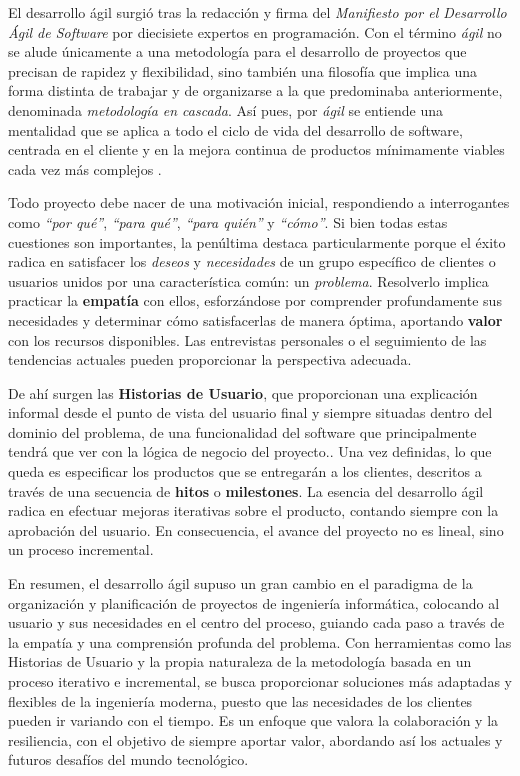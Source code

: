 \vspace{0.5cm}
El desarrollo ágil surgió tras la redacción y firma del \textit{Manifiesto por el Desarrollo Ágil de Software} \cite{agile-manifest} por diecisiete expertos en programación. Con el término \textit{ágil} no se alude únicamente a una metodología para el desarrollo de proyectos que precisan de rapidez y flexibilidad, sino también una filosofía que implica una forma distinta de trabajar y de organizarse a la que predominaba anteriormente, denominada \textit{metodología en cascada}. Así pues, por \textit{ágil} se entiende una mentalidad que se aplica a todo el ciclo de vida del desarrollo de software, centrada en el cliente y en la mejora continua de productos mínimamente viables cada vez más complejos \cite{jj-agile-manifesto}.

\vspace{0.5cm}
Todo proyecto debe nacer de una motivación inicial, respondiendo a interrogantes como \textit{``por qué''}, \textit{``para qué''}, \textit{``para quién''} y \textit{``cómo''}. Si bien todas estas cuestiones son importantes, la penúltima destaca particularmente porque el éxito radica en satisfacer los \textit{deseos} y \textit{necesidades} de un grupo específico de clientes o usuarios unidos por una característica común: un \textit{problema}. 
Resolverlo implica practicar la \textbf{empatía} con ellos, esforzándose por comprender profundamente sus necesidades y determinar cómo satisfacerlas de manera óptima, aportando \textbf{valor} con los recursos disponibles. Las entrevistas personales o el seguimiento de las tendencias actuales pueden proporcionar la perspectiva adecuada.

\vspace{0.5cm}
De ahí surgen las \textbf{Historias de Usuario}, que proporcionan una explicación informal desde el punto de vista del usuario final y siempre situadas dentro del dominio del problema, de una funcionalidad del software que principalmente tendrá que ver con la lógica de negocio del proyecto.\cite{jj-design-thinking}. Una vez definidas, lo que queda es especificar los productos que se entregarán a los clientes, descritos a través de una secuencia de \textbf{hitos} o \textbf{milestones}. La esencia del desarrollo ágil radica en efectuar mejoras iterativas sobre el producto, contando siempre con la aprobación del usuario. En consecuencia, el avance del proyecto no es lineal, sino un proceso incremental.

\vspace{0.5cm}
En resumen, el desarrollo ágil supuso un gran cambio en el paradigma de la organización y planificación de proyectos de ingeniería informática, colocando al usuario y sus necesidades en el centro del proceso, guiando cada paso a través de la empatía y una comprensión profunda del problema. Con herramientas como las Historias de Usuario y la propia naturaleza de la metodología basada en un proceso iterativo e incremental, se busca proporcionar soluciones más adaptadas y flexibles de la ingeniería moderna, puesto que las necesidades de los clientes pueden ir variando con el tiempo. Es un enfoque que valora la colaboración y la resiliencia, con el objetivo de siempre aportar valor, abordando así los actuales y futuros desafíos del mundo tecnológico.

